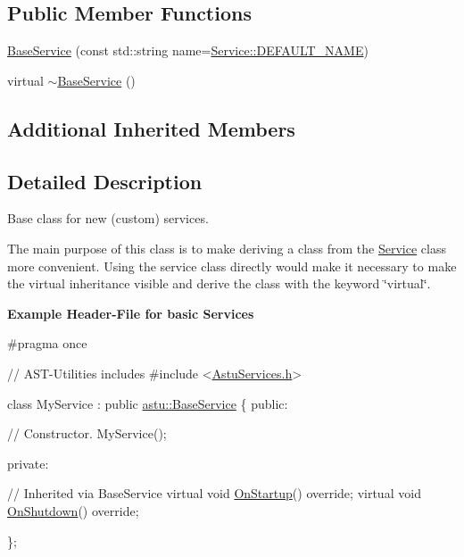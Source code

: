 \subsection*{Public Member Functions}
\begin{DoxyCompactItemize}
\item 
\hyperlink{classastu_1_1BaseService_a8e95fc9bc1571dcbc9fb25237f968808}{Base\+Service} (const std\+::string name=\hyperlink{classastu_1_1Service_a8bb66bb984aa9490026232b193896634}{Service\+::\+D\+E\+F\+A\+U\+L\+T\+\_\+\+N\+A\+ME})
\item 
virtual \hyperlink{classastu_1_1BaseService_ac4c335f1449a633e569a516560b18ef8}{$\sim$\+Base\+Service} ()
\end{DoxyCompactItemize}
\subsection*{Additional Inherited Members}


\subsection{Detailed Description}
Base class for new (custom) services.

The main purpose of this class is to make deriving a class from the \hyperlink{classastu_1_1Service}{Service} class more convenient. Using the service class directly would make it necessary to make the virtual inheritance visible and derive the class with the keyword \char`\"{}virtual\char`\"{}.

{\bfseries Example Header-\/\+File for basic Services} 
\begin{DoxyCodeInclude}
\textcolor{preprocessor}{#pragma once}

\textcolor{comment}{// AST-Utilities includes}
\textcolor{preprocessor}{#include <\hyperlink{AstuServices_8h}{AstuServices.h}>}

\textcolor{keyword}{class }MyService : \textcolor{keyword}{public} \hyperlink{classastu_1_1BaseService}{astu::BaseService}
\{
\textcolor{keyword}{public}:

    \textcolor{comment}{// Constructor.}
    MyService();

\textcolor{keyword}{private}:

    \textcolor{comment}{// Inherited via BaseService}
    \textcolor{keyword}{virtual} \textcolor{keywordtype}{void} \hyperlink{classastu_1_1Service_a357dc663e000b1f086f681ec3c459bfe}{OnStartup}() \textcolor{keyword}{override};
    \textcolor{keyword}{virtual} \textcolor{keywordtype}{void} \hyperlink{classastu_1_1Service_a1e1dff727df791c57fae782d8a613c5f}{OnShutdown}() \textcolor{keyword}{override};

\};
\end{DoxyCodeInclude}


